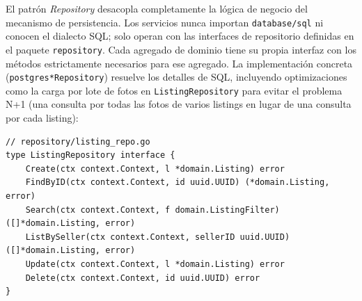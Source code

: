 \documentclass[12pt,a4paper]{article}
\begin{document}
El patrón \emph{Repository} desacopla completamente la lógica de negocio del mecanismo de
persistencia. Los servicios nunca importan \texttt{database/sql} ni conocen el dialecto SQL; solo
operan con las interfaces de repositorio definidas en el paquete \texttt{repository}. Cada agregado de dominio tiene su propia interfaz con los métodos estrictamente necesarios para
ese agregado. La implementación concreta (\texttt{postgres*Repository}) resuelve los detalles
de SQL, incluyendo optimizaciones como la carga por lote de fotos en \texttt{ListingRepository}
para evitar el problema N+1 (una consulta por todas las fotos de varios listings en lugar de una
consulta por cada listing):

\begin{lstlisting}[style=gostyle]
// repository/listing_repo.go
type ListingRepository interface {
    Create(ctx context.Context, l *domain.Listing) error
    FindByID(ctx context.Context, id uuid.UUID) (*domain.Listing, error)
    Search(ctx context.Context, f domain.ListingFilter) ([]*domain.Listing, error)
    ListBySeller(ctx context.Context, sellerID uuid.UUID) ([]*domain.Listing, error)
    Update(ctx context.Context, l *domain.Listing) error
    Delete(ctx context.Context, id uuid.UUID) error
}
\end{lstlisting}

\begin{center}
\end{center}
\end{document}
